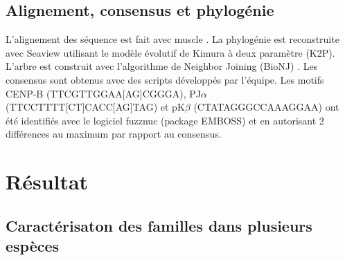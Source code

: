 \documentclass[12pt,a4paper]{article}
\begin{document}
\subsection{Alignement, consensus et phylogénie}
L'alignement des séquence est fait avec muscle \cite{muscle}. La phylogénie est reconstruite avec Seaview 
\cite{seaview} 
utilisant le modèle évolutif de Kimura à deux paramètre (K2P). L'arbre est construit avec l'algorithme  de Neighbor Joining (BioNJ) \cite{NJ}. Les consensus sont obtenus avec des scripts développés par l'équipe. Les motifs CENP-B (TTCGTTGGAA[AG]CGGGA), PJ$\alpha$ (TTCCTTTT[CT]CACC[AG]TAG) et pK$\beta$ (CTATAGGGCCAAAGGAA) ont été identifiés avec le logiciel fuzznuc (package EMBOSS) \cite{emboss} et en autorisant 2 différences au maximum par rapport au consensus. 

\section{Résultat}
	\subsection{Caractérisaton des familles dans plusieurs espèces}
\end{document}
